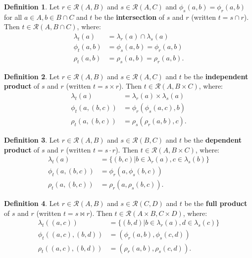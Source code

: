 \documentclass{article}
\theoremstyle{definition}
\newtheorem{definition}{Definition}[subsection]
\theoremstyle{plain}
\def\rule{\mathcal{R}}
\begin{document}
\begin{definition}
  Let $ r \in \rule (A, B) $
  and $ s \in \rule (A, C) $
  and $ \phi_s (a, b) = \phi_r (a, b) $
  for all $ a \in A, b \in B \cap C $
  and $ t $ be the \textbf{intersection} of $ s $ and $ r $
  (written $ t = s \cap r $).
  Then $ t \in \rule (A, B \cap C) $, where:
  \begin{align}
    \lambda_t (a)    & = \lambda_r (a) \cap \lambda_s (a) \\
       \phi_t (a, b) & = \phi_s (a, b) = \phi_r (a, b) \\
       \rho_t (a, b) & = \rho_s (a, b) = \rho_r (a, b).
  \end{align}
\end{definition}

\begin{definition}
  Let $ r \in \rule (A, B) $
  and $ s \in \rule (A, C) $
  and $ t $ be the \textbf{independent product} of $ s $ and $ r $
  (written $ t = s \times r $).
  Then $ t \in \rule (A, B \times C) $, where:
  \begin{align}
    \lambda_t (a)         & = \lambda_r (a) \times \lambda_s (a) \\
       \phi_t (a, (b, c)) & =    \phi_r (\phi_s (a, c), b) \\
       \rho_t (a, (b, c)) & =    \rho_s (\rho_r (a, b), c).
  \end{align}
\end{definition}

\begin{definition}
  Let $ r \in \rule (A, B) $
  and $ s \in \rule (B, C) $
  and $ t $ be the \textbf{dependent product} of $ s $ and $ r $
  (written $ t = s \cdot r $).
  Then $ t \in \rule (A, B \times C) $, where:
  \begin{align}
    \lambda_t (a)         & = \{ (b, c) | b \in \lambda_r (a), c \in \lambda_s (b) \} \\
       \phi_t (a, (b, c)) & =    \phi_r (a, \phi_s (b, c)) \\
       \rho_t (a, (b, c)) & =    \rho_r (a, \rho_s (b, c)).
  \end{align}
\end{definition}

\begin{definition}
  Let $ r \in \rule (A, B) $
  and $ s \in \rule (C, D) $
  and $ t $ be the \textbf{full product} of $ s $ and $ r $
  (written $ t = s \bowtie r $).
  Then $ t \in \rule (A \times B, C \times D) $, where:
  \begin{align}
    \lambda_t ((a, c))         & = \{ (b, d) | b \in \lambda_r (a), d \in \lambda_s (c) \} \\
       \phi_t ((a, c), (b, d)) & = (\phi_r (a, b), \phi_s (c, d)) \\
       \rho_t ((a, c), (b, d)) & = (\rho_r (a, b), \rho_s (c, d)).
  \end{align}
\end{definition}
\end{document}
